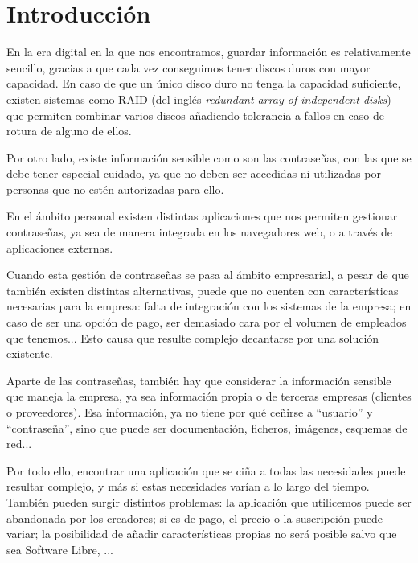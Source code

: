 \documentclass{\ClassPath/viu-tfm-template}
\begin{document}
\pagebreak



\tableofcontents

\chapter{Introducción}
En la era digital en la que nos encontramos, guardar información es relativamente sencillo, gracias a que cada vez conseguimos tener discos duros con mayor capacidad. En caso de que un único disco duro no tenga la capacidad suficiente, existen sistemas como RAID (del inglés \textit{redundant array of independent disks}) que permiten combinar varios discos añadiendo tolerancia a fallos en caso de rotura de alguno de ellos.

Por otro lado, existe información sensible como son las contraseñas, con las que se debe tener especial cuidado, ya que no deben ser accedidas ni utilizadas por personas que no estén autorizadas para ello.

En el ámbito personal existen distintas aplicaciones que nos permiten gestionar contraseñas, ya sea de manera integrada en los navegadores web, o a través de aplicaciones externas.

Cuando esta gestión de contraseñas se pasa al ámbito empresarial, a pesar de que también existen distintas alternativas, puede que no cuenten con características necesarias para la empresa: falta de integración con los sistemas de la empresa; en caso de ser una opción de pago, ser demasiado cara por el volumen de empleados que tenemos... Esto causa que resulte complejo decantarse por una solución existente.


Aparte de las contraseñas, también hay que considerar la información sensible que maneja la empresa, ya sea información propia o de terceras empresas (clientes o proveedores). Esa información, ya no tiene por qué ceñirse a “usuario” y “contraseña”, sino que puede ser documentación, ficheros, imágenes, esquemas de red...

Por todo ello, encontrar una aplicación que se ciña a todas las necesidades puede resultar complejo, y más si estas necesidades varían a lo largo del tiempo. También pueden surgir distintos problemas: la aplicación que utilicemos puede ser abandonada por los creadores; si es de pago, el precio o la suscripción puede variar; la posibilidad de añadir características propias no será posible salvo que sea Software Libre, ...
\end{document}
